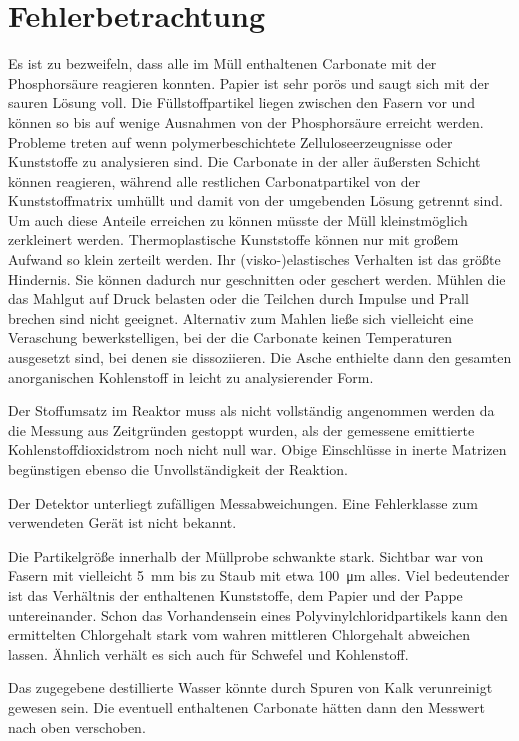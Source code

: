 \chapter{Fehlerbetrachtung}
\label{sec:fehler}

Es ist zu bezweifeln, dass alle im Müll enthaltenen Carbonate mit der Phosphorsäure reagieren konnten. Papier ist sehr porös und saugt sich mit der sauren Lösung voll. Die Füllstoffpartikel liegen zwischen den Fasern vor und können so bis auf wenige Ausnahmen von der Phosphorsäure erreicht werden. Probleme treten auf wenn polymerbeschichtete Zelluloseerzeugnisse oder Kunststoffe zu analysieren sind. Die Carbonate in der aller äußersten Schicht können reagieren, während alle restlichen Carbonatpartikel von der Kunststoffmatrix umhüllt und damit von der umgebenden Lösung getrennt sind. Um auch diese Anteile erreichen zu können müsste der Müll kleinstmöglich zerkleinert werden. Thermoplastische Kunststoffe können nur mit großem Aufwand so klein zerteilt werden. Ihr (visko-)elastisches Verhalten ist das größte Hindernis. Sie können dadurch nur geschnitten oder geschert werden. Mühlen die das Mahlgut auf Druck belasten oder die Teilchen durch Impulse und Prall brechen sind nicht geeignet.
Alternativ zum Mahlen ließe sich vielleicht eine Veraschung bewerkstelligen, bei der die Carbonate keinen Temperaturen ausgesetzt sind, bei denen sie dissoziieren. Die Asche enthielte dann den gesamten anorganischen Kohlenstoff in leicht zu analysierender Form.

Der Stoffumsatz im Reaktor muss als nicht vollständig angenommen werden da die Messung aus Zeitgründen gestoppt wurden, als der gemessene emittierte Kohlenstoffdioxidstrom noch nicht null war. Obige Einschlüsse in inerte Matrizen begünstigen ebenso die Unvollständigkeit der Reaktion. 



Der Detektor unterliegt zufälligen Messabweichungen. Eine Fehlerklasse zum verwendeten Gerät ist nicht bekannt. 

Die Partikelgröße innerhalb der Müllprobe schwankte stark. Sichtbar war von Fasern mit vielleicht \SI{5}{\milli\meter} bis zu Staub mit etwa \SI{100}{\micro\meter} alles. Viel bedeutender ist das Verhältnis der enthaltenen Kunststoffe, dem Papier und der Pappe untereinander. Schon das Vorhandensein eines Polyvinylchloridpartikels kann den ermittelten Chlorgehalt stark vom wahren mittleren Chlorgehalt abweichen lassen.
Ähnlich verhält es sich auch für Schwefel und Kohlenstoff.


Das zugegebene destillierte Wasser könnte durch Spuren von Kalk verunreinigt gewesen sein. Die eventuell enthaltenen Carbonate hätten dann den Messwert nach oben verschoben.


